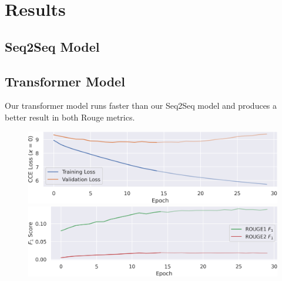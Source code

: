 \section{Results}

\subsection{Seq2Seq Model}

\subsection{Transformer Model}
Our transformer model runs faster than our Seq2Seq model and produces a better result in both Rouge metrics.

\begin{figure}[h]
	\includegraphics[width = \textwidth]{transformer_loss.png}
	\includegraphics[width = \textwidth]{transformer_rouge.png}
\end{figure}
